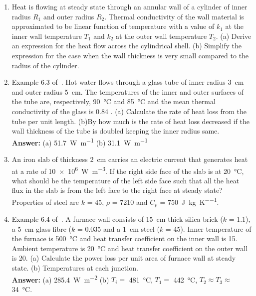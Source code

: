 \begin{enumerate}

 \item Heat is flowing at steady state through an annular wall of a cylinder of
inner radius $R_1$ and outer radius $R_2$. Thermal conductivity of the wall
material is approximated to be linear function of temperature with a value of
$k_1$ at the inner wall temperature $T_1$ and $k_2$ at the outer wall
temperature $T_2$. (a) Derive an expression for the heat flow across the
cylindrical shell. (b) Simplify the expression for the case when the wall
thickness is very small compared to the radius of the cylinder.


 \item Example 6.3 of~\cite{gaskell}. Hot water flows through a glass tube of
inner radius \SI{3}{\cm} and outer radius \SI{5}{\cm}. The temperatures of the
inner and outer surfaces of the tube are, respectively, \SI{90}{\celsius} and
\SI{85}{\celsius} and the mean thermal conductivity of the glass is
\SI{0.84}{\wpmk} . (a) Calculate the rate of heat loss from the tube per unit
length. (b)By how much is the rate of heat loss decreased if the wall thickness
of the tube is doubled keeping the inner radius same.\\ {\bf Answer:} (a)
\SI{51.7}{\watt\per\metre} (b) \SI{31.1}{\watt\per\metre}

 \item An iron slab of thickness \SI{2}{\cm} carries an electric current that
generates heat at a rate of \SI{10e6}{\watt\per\metre\cubed}. If the right side
face of the slab is at \SI{20}{\celsius}, what should be the temperature of the
left side face such that all the heat flux in the slab is from the left face to
the right face at steady state? Properties of steel are $k$ = \SI{45}{\wpmk},
$\rho$ = \SI{7210}{\kgpmc} and $C_p$ =
\SI{750}{\joule\per\kilo\gram\per\kelvin}.

\item Example 6.4 of~\cite{gaskell}. A furnace wall consists of \SI{15}{
		\centi\metre} thick silica brick ($k$ = \SI{1.1}{\wpmk}), a \SI{5}{\cm} glass
fibre ($k$ = \SI{0.035}{\wpmk} and a \SI{1}{\cm} steel ($k$ = \SI{45}{\wpmk}).
Inner temperature of the furnace is \SI{500}{\celsius} and heat transfer
coefficient on the inner wall is \SI{15}{\wpmsk}. Ambient temperature is
\SI{20}{\celsius} and heat transfer coefficient on the outer wall is
\SI{20}{\wpmsk}. (a) Calculate the power loss per unit area of furnace wall at
steady state. (b) Temperatures at each junction. \\ {\bf Answer:} (a)
		\SI{285.4}{\watt\per\metre\squared} (b) $T_i = $ \SI{481}{\celsius}, $T_1 = $ \SI{442}{
			\celsius}, $T_2 \approx T_3 \approx$ \SI{34}{\celsius}.


\end{enumerate}
